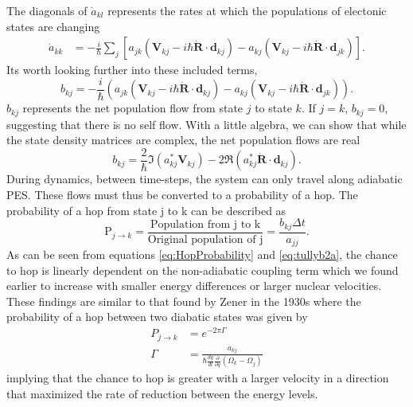           The diagonals of \(\dot{a}_{kl}\) represents the rates at which the populations of electonic states are changing
          \begin{align}
            \dot{a}_{kk} &= -\frac{i}{\hbar}\sum_j \left[ a_{jk} (\mathbf{V}_{kj} - i\hbar \dot{\mathbf{R}} \cdot \mathbf{d}_{kj})
              - a_{kj} ( \mathbf{V}_{kj} - i\hbar \dot{\mathbf{R}} \cdot \mathbf{d}_{jk}) \right].
          \end{align}
          Its worth looking further into these included terms,
          \begin{equation}
            b_{kj} = - \frac{i}{\hbar} \left(a_{jk} (\mathbf{V}_{kj} - i\hbar \dot{\mathbf{R}} \cdot \mathbf{d}_{kj}) - a_{kj} ( \mathbf{V}_{kj} - i\hbar \dot{\mathbf{R}} \cdot \mathbf{d}_{jk})\right).
          \end{equation}
          \(b_{kj}\) represents the net population flow from state \(j\) to state \(k\). If \(j = k \), \(b_{kj} = 0\), suggesting that there is no self flow.
          With a little algebra, we can show that while the state density matrices are complex, the net population flows are real
          \begin{equation} \label{eq:tullyb2a} 
            b_{kj} =
            \frac{2}{\hbar}\Im\left(a_{kj}^*\mathbf{V}_{kj}\right) - 2\Re\left(a_{kj}^*
            \dot{\mathbf{R}} \cdot \mathbf{d}_{kj}\right).
          \end{equation}
          During dynamics, between time-steps, the system can only travel along adiabatic PES. 
          These flows must thus be converted to a probability of a hop.
          The probability of a hop from state j to k can be described as
          \begin{equation} \label{eq:HopProbability}
            \text{P}_{j \rightarrow k} = \frac{\text{Population from j to k}}{\text{Original population of j}} = \frac{b_{kj} \Delta t}{a_{jj}}.
          \end{equation}
          As can be seen from equations \ref{eq:HopProbability} and \ref{eq:tullyb2a}, the chance to hop is linearly dependent on the non-adiabatic coupling term which we found earlier to increase with smaller energy differences or larger nuclear velocities. 
          These findings are similar to that found by Zener in the 1930s where the probability of a hop between two diabatic states was given by
          \begin{align}
            P_{j \rightarrow k} &= e ^{-2\pi \Gamma}\\
            \Gamma &= \frac{a_{kj}}{\hbar \frac{dq}{dt}\frac{\partial}{\partial q} (\Omega_k - \Omega_j)}
          \end{align}
     implying that the chance to hop is greater with a larger velocity in a direction that maximized the rate of reduction between the energy levels.\cite{zener1932non}

